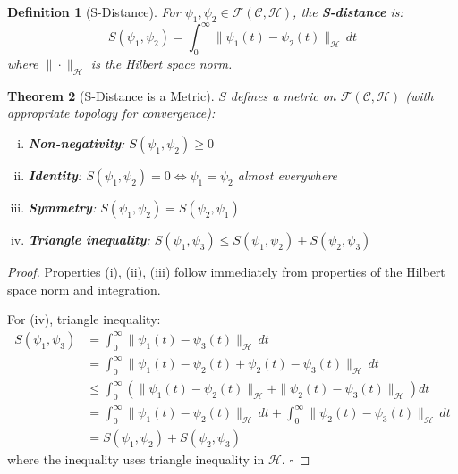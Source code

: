 \documentclass[12pt,a4paper]{article}
\newtheorem{theorem}{Theorem}[section]
\newtheorem{definition}[theorem]{Definition}
\begin{document}
\begin{definition}[S-Distance]
\label{def:s_distance}
For $\psi_1, \psi_2 \in \mathcal{F}(\mathcal{C}, \mathcal{H})$, the \textbf{S-distance} is:
\begin{equation}
S(\psi_1, \psi_2) = \int_0^{\infty} \|\psi_1(t) - \psi_2(t)\|_{\mathcal{H}} \, dt
\end{equation}
where $\|\cdot\|_{\mathcal{H}}$ is the Hilbert space norm.
\end{definition}

\begin{theorem}[S-Distance is a Metric]
\label{thm:s_metric}
$S$ defines a metric on $\mathcal{F}(\mathcal{C}, \mathcal{H})$ (with appropriate topology for convergence):

\begin{enumerate}[(i)]
\item \textbf{Non-negativity}: $S(\psi_1, \psi_2) \geq 0$
\item \textbf{Identity}: $S(\psi_1, \psi_2) = 0 \iff \psi_1 = \psi_2$ almost everywhere
\item \textbf{Symmetry}: $S(\psi_1, \psi_2) = S(\psi_2, \psi_1)$
\item \textbf{Triangle inequality}: $S(\psi_1, \psi_3) \leq S(\psi_1, \psi_2) + S(\psi_2, \psi_3)$
\end{enumerate}
\end{theorem}

\begin{proof}
Properties (i), (ii), (iii) follow immediately from properties of the Hilbert space norm and integration.

For (iv), triangle inequality:
\begin{align}
S(\psi_1, \psi_3) &= \int_0^{\infty} \|\psi_1(t) - \psi_3(t)\|_{\mathcal{H}} \, dt \\
&= \int_0^{\infty} \|\psi_1(t) - \psi_2(t) + \psi_2(t) - \psi_3(t)\|_{\mathcal{H}} \, dt \\
&\leq \int_0^{\infty} \left( \|\psi_1(t) - \psi_2(t)\|_{\mathcal{H}} + \|\psi_2(t) - \psi_3(t)\|_{\mathcal{H}} \right) dt \\
&= \int_0^{\infty} \|\psi_1(t) - \psi_2(t)\|_{\mathcal{H}} \, dt + \int_0^{\infty} \|\psi_2(t) - \psi_3(t)\|_{\mathcal{H}} \, dt \\
&= S(\psi_1, \psi_2) + S(\psi_2, \psi_3)
\end{align}
where the inequality uses triangle inequality in $\mathcal{H}$. $\square$
\end{proof}
\end{document}
